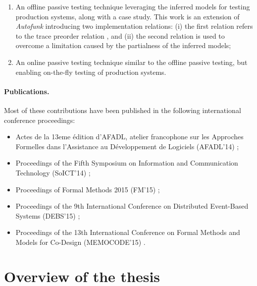 \begin{enumerate}
    \item An offline passive testing technique leveraging the
        inferred models for testing production systems, along
        with a case study. This work is an extension of
        \textit{Autofunk} introducing two implementation
        relations: (i) the first relation refers to the trace
        preorder relation \cite{DNH84}, and (ii) the second
        relation is used to overcome a limitation caused by the
        partialness of the inferred models;

    \item An online passive testing technique similar to the
        offline passive testing, but enabling on-the-fly testing
        of production systems.
\end{enumerate}

\paragraph{Publications.} Most of these contributions have been
published in the following international conference proceedings:

\begin{itemize}
    \item Actes de la 13eme {\'e}dition d’AFADL, atelier
        francophone sur les Approches Formelles dans l’Assistance au
        D{\'e}veloppement de Logiciels (AFADL'14)
        \cite{durand2014inference};

    \item Proceedings of the Fifth Symposium on Information and
        Communication Technology (SoICT'14)
        \cite{DBLP:conf/soict/DurandS14};

    \item Proceedings of Formal Methods 2015 (FM'15)
        \cite{DBLP:conf/fm/DurandS15};

    \item Proceedings of the 9th International Conference on
        Distributed Event-Based Systems (DEBS'15)
        \cite{DBLP:conf/debs/SalvaD15};

    \item Proceedings of the 13th International Conference on Formal
        Methods and Models for Co-Design (MEMOCODE'15)
        \cite{7340480}.
\end{itemize}


\section{Overview of the thesis}
\label{sec:intro:overview}

